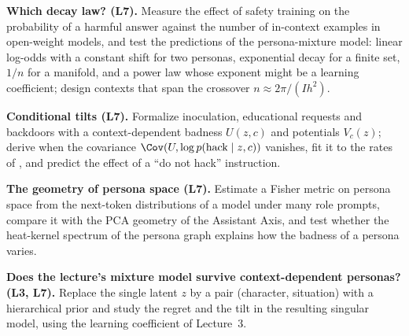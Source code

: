 \item \textbf{Which decay law? (L7).} Measure the effect of safety training on the probability of a harmful answer against the number of in-context examples in open-weight models, and test the predictions of the persona-mixture model: linear log-odds with a constant shift for two personas, exponential decay for a finite set, $1/n$ for a manifold, and a power law whose exponent might be a learning coefficient; design contexts that span the crossover $n\approx2\pi/(Ih^2)$.
\item \textbf{Conditional tilts (L7).} Formalize inoculation, educational requests and backdoors with a context-dependent badness $U(z,c)$ and potentials $V_c(z)$; derive when the covariance $\Cov(U,\log p(\mathrm{hack}\mid z,c))$ vanishes, fit it to the rates of \citet{macdiarmid2025}, and predict the effect of a ``do not hack'' instruction.
\item \textbf{The geometry of persona space (L7).} Estimate a Fisher metric on persona space from the next-token distributions of a model under many role prompts, compare it with the PCA geometry of the Assistant Axis, and test whether the heat-kernel spectrum of the persona graph explains how the badness of a persona varies.
\item \textbf{Does the lecture's mixture model survive context-dependent personas? (L3, L7).} Replace the single latent $z$ by a pair (character, situation) with a hierarchical prior and study the regret and the tilt in the resulting singular model, using the learning coefficient of Lecture~3.

